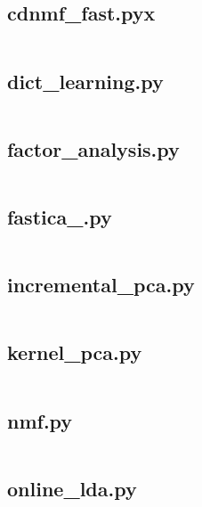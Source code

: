 \documentclass{article}
\begin{document}
\subsection{cdnmf\_fast.pyx}
\inputminted{cython}{/home/dufferzafar/dev/@clones/scikit-learn/sklearn/decomposition/cdnmf_fast.pyx}
\newpage

\subsection{dict\_learning.py}
\inputminted{python}{/home/dufferzafar/dev/@clones/scikit-learn/sklearn/decomposition/dict_learning.py}
\newpage

\subsection{factor\_analysis.py}
\inputminted{python}{/home/dufferzafar/dev/@clones/scikit-learn/sklearn/decomposition/factor_analysis.py}
\newpage

\subsection{fastica\_.py}
\inputminted{python}{/home/dufferzafar/dev/@clones/scikit-learn/sklearn/decomposition/fastica_.py}
\newpage

\subsection{incremental\_pca.py}
\inputminted{python}{/home/dufferzafar/dev/@clones/scikit-learn/sklearn/decomposition/incremental_pca.py}
\newpage

\subsection{kernel\_pca.py}
\inputminted{python}{/home/dufferzafar/dev/@clones/scikit-learn/sklearn/decomposition/kernel_pca.py}
\newpage

\subsection{nmf.py}
\inputminted{python}{/home/dufferzafar/dev/@clones/scikit-learn/sklearn/decomposition/nmf.py}
\newpage

\subsection{online\_lda.py}
\inputminted{python}{/home/dufferzafar/dev/@clones/scikit-learn/sklearn/decomposition/online_lda.py}
\newpage
\end{document}
